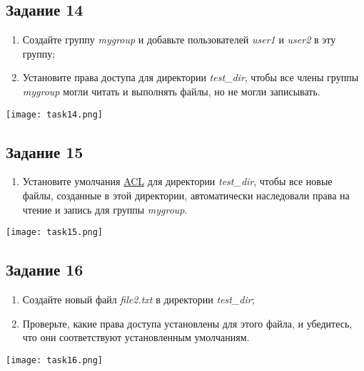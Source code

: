 \documentclass[12pt, a4paper]{report}
\begin{document}
	\subsection*{Задание 14}
	\begin{enumerate}
		\item Создайте группу \textit{mygroup} и добавьте пользователей \textit{user1} и \textit{user2} в эту группу;
		\item Установите права доступа для директории \textit{test\_dir}, чтобы все члены группы \textit{mygroup} могли читать и выполнять файлы, но не могли записывать.
	\end{enumerate}
	\lstset{style=mystyle}
	
	\begin{center}
		\texttt{[image: task14.png]}
	\end{center}

	\subsection*{Задание 15}
	\begin{enumerate}
		\item Установите умолчания \underline{ACL} для директории \textit{test\_dir}, чтобы все новые файлы, созданные в этой директории, автоматически наследовали права на чтение и запись для группы \textit{mygroup}.
	\end{enumerate}
	\lstset{style=mystyle}
	
	\begin{center}
		\texttt{[image: task15.png]}
	\end{center}

	\subsection*{Задание 16}
	\begin{enumerate}
		\item Создайте новый файл \textit{file2.txt} в директории \textit{test\_dir};
		\item Проверьте, какие права доступа установлены для этого файла, и убедитесь, что они соответствуют установленным умолчаниям.
	\end{enumerate}
	\lstset{style=mystyle}
	
	\begin{center}
		\texttt{[image: task16.png]}
	\end{center}
\end{document}
